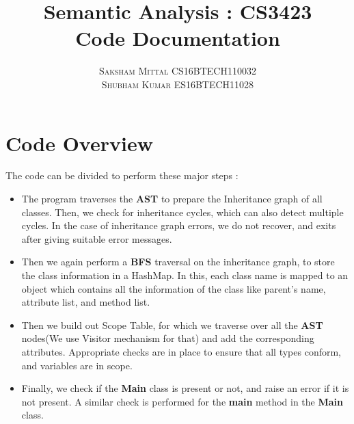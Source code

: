 \documentclass{article}
\begin{document}
\title
{\Huge \textbf{Semantic Analysis : CS3423}\\ 
\huge Code Documentation }
\author{\textsc{Saksham Mittal CS16BTECH110032} \\ 
\textsc{Shubham Kumar ES16BTECH11028} \\}

\maketitle
\vspace{350px}

\tableofcontents{}
\vspace{400px}

\section{Code Overview}
The code can be divided to perform these major steps : \\
\begin{itemize}

    \item The program traverses the \textbf{AST} to prepare the Inheritance graph of all classes. Then, we check for inheritance cycles, which can also detect multiple cycles. In the case of inheritance graph errors, we do not recover, and exits after giving suitable error messages. \\
    \item Then we again perform a \textbf{BFS} traversal on the inheritance graph, to store the class information in a HashMap. In this, each class name is mapped to an object which contains all the information of the class like parent’s name, attribute list, and method list. \\
    \item Then we build out Scope Table, for which we traverse over all the \textbf{AST} nodes(We use Visitor mechanism for that) and add the corresponding attributes. Appropriate checks are in place to ensure that all types conform, and variables are in scope. \\
    \item Finally, we check if the \textbf{Main} class is present or not, and raise an error if it is not present. A similar check is performed for the \textbf{main} method in the \textbf{Main} class. \\

\end{itemize}
\end{document}
